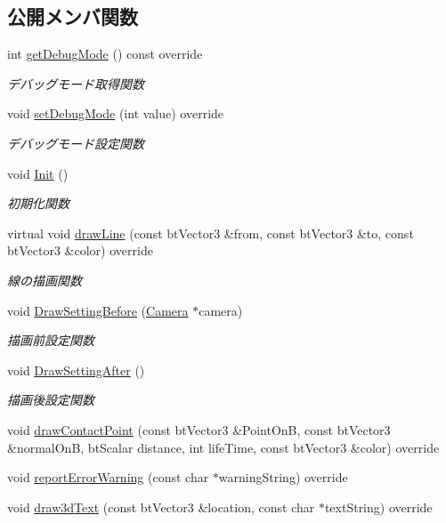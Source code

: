 \subsection*{公開メンバ関数}
\begin{DoxyCompactItemize}
\item 
int \mbox{\hyperlink{class_bullet_physics_debug_a6b75505ddd99b72ab6d72658a835419f}{get\+Debug\+Mode}} () const override
\begin{DoxyCompactList}\small\item\em デバッグモード取得関数 \end{DoxyCompactList}\item 
void \mbox{\hyperlink{class_bullet_physics_debug_ae97707d5b14ac1c55edec5d4686dd802}{set\+Debug\+Mode}} (int value) override
\begin{DoxyCompactList}\small\item\em デバッグモード設定関数 \end{DoxyCompactList}\item 
void \mbox{\hyperlink{class_bullet_physics_debug_a1881672318e69c82f3c4f3eee81c0f11}{Init}} ()
\begin{DoxyCompactList}\small\item\em 初期化関数 \end{DoxyCompactList}\item 
virtual void \mbox{\hyperlink{class_bullet_physics_debug_ad2602a90645ab868f8b3aafc98be7109}{draw\+Line}} (const bt\+Vector3 \&from, const bt\+Vector3 \&to, const bt\+Vector3 \&color) override
\begin{DoxyCompactList}\small\item\em 線の描画関数 \end{DoxyCompactList}\item 
void \mbox{\hyperlink{class_bullet_physics_debug_ac88494485e3532fcb79c56a715dfa737}{Draw\+Setting\+Before}} (\mbox{\hyperlink{class_camera}{Camera}} $\ast$camera)
\begin{DoxyCompactList}\small\item\em 描画前設定関数 \end{DoxyCompactList}\item 
void \mbox{\hyperlink{class_bullet_physics_debug_a6d38dedc62b0479bf65f4f92058ca9b8}{Draw\+Setting\+After}} ()
\begin{DoxyCompactList}\small\item\em 描画後設定関数 \end{DoxyCompactList}\item 
void \mbox{\hyperlink{class_bullet_physics_debug_aa895e20c63340cb995693d3ad8f71a19}{draw\+Contact\+Point}} (const bt\+Vector3 \&Point\+OnB, const bt\+Vector3 \&normal\+OnB, bt\+Scalar distance, int life\+Time, const bt\+Vector3 \&color) override
\item 
void \mbox{\hyperlink{class_bullet_physics_debug_aeec16a6d939beb6afbae9760310ec098}{report\+Error\+Warning}} (const char $\ast$warning\+String) override
\item 
void \mbox{\hyperlink{class_bullet_physics_debug_a517d4d3b25ee5d9a83d984bb19e81ca4}{draw3d\+Text}} (const bt\+Vector3 \&location, const char $\ast$text\+String) override
\end{DoxyCompactItemize}
